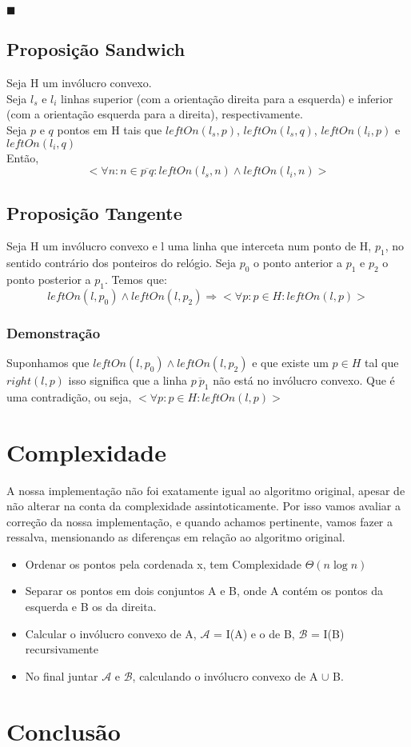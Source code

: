 \documentclass[11pt]{article}
\begin{document}
\hfill $\blacksquare$

\subsection{Proposição Sandwich}
Seja H um invólucro convexo.\\
Seja $l_s$ e $l_i$ linhas superior (com a orientação direita para a esquerda) e 
inferior (com a orientação esquerda para a direita), respectivamente.\\
Seja $p$ e $q$ pontos em H tais que $leftOn(l_s, p)$, $leftOn(l_s, q)$, $leftOn(l_i, p)$ e $leftOn(l_i, q)$\\
Então,
        $$<\forall n : n \in \overline{p\ q} : leftOn(l_s, n) \wedge leftOn(l_i, n)>$$

\subsection{Proposição Tangente}
Seja 
    H um invólucro convexo e 
    l uma linha que interceta num ponto de H, $p_1$,
no sentido contrário dos ponteiros do relógio.
Seja $p_0$ o ponto anterior a $p_1$ e $p_2$ o ponto posterior a $p_1$.
Temos que:
$$leftOn(l, p_0) \wedge leftOn(l, p_2) \Rightarrow
    <\forall p : p \in H : leftOn(l, p)>$$

\subsubsection{Demonstração}
Suponhamos que $leftOn(l, p_0) \wedge leftOn(l, p_2)$ 
e que existe um $p \in H$ tal que $right(l, p)$
isso significa que a linha $\overline{p\ p_1}$ não está no invólucro convexo.
Que é uma contradição, ou seja, $<\forall p : p \in H : leftOn(l, p)>$


\section{Complexidade}
A nossa implementação não foi exatamente igual ao algoritmo original,
apesar de não alterar na conta da complexidade assintoticamente.
Por isso vamos avaliar a correção da nossa implementação, e quando 
achamos pertinente, vamos fazer a ressalva, mensionando as diferenças 
em relação ao algoritmo original.

\begin{itemize}
    \item Ordenar os pontos pela cordenada x, tem Complexidade $\Theta(n\log{}n)$
    \item Separar os pontos em dois conjuntos A e B, onde A contém os pontos da esquerda e B os da direita.
    \item Calcular o invólucro convexo de A, $\mathcal{A}$ = I(A) e o de B, $\mathcal{B}$ = I(B) recursivamente
    \item No final juntar $\mathcal{A}$ e $\mathcal{B}$, calculando o invólucro convexo de A $\cup$ B.
\end{itemize}


\section{Conclusão}
\end{document}
